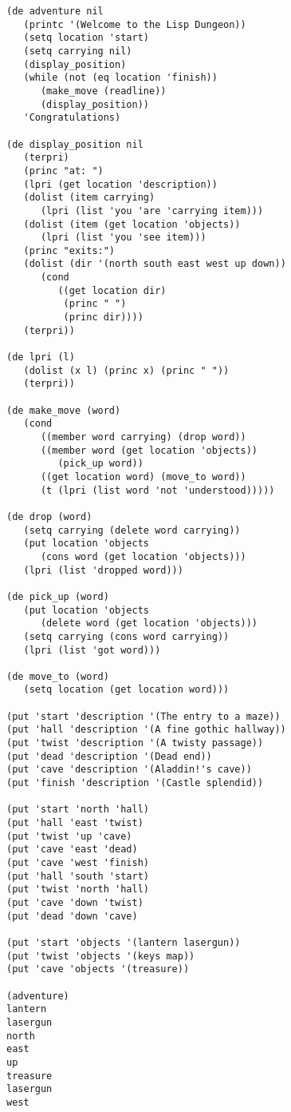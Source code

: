 {\small\begin{verbatim}
(de adventure nil
   (printc '(Welcome to the Lisp Dungeon))
   (setq location 'start)
   (setq carrying nil)
   (display_position)
   (while (not (eq location 'finish))
      (make_move (readline))
      (display_position))
   'Congratulations)

(de display_position nil
   (terpri)
   (princ "at: ")
   (lpri (get location 'description))
   (dolist (item carrying)
      (lpri (list 'you 'are 'carrying item)))
   (dolist (item (get location 'objects))
      (lpri (list 'you 'see item)))
   (princ "exits:")
   (dolist (dir '(north south east west up down))
      (cond
         ((get location dir)
          (princ " ")
          (princ dir))))
   (terpri))

(de lpri (l)
   (dolist (x l) (princ x) (princ " "))
   (terpri))

(de make_move (word)
   (cond
      ((member word carrying) (drop word))
      ((member word (get location 'objects))
         (pick_up word))
      ((get location word) (move_to word))
      (t (lpri (list word 'not 'understood)))))

(de drop (word)
   (setq carrying (delete word carrying))
   (put location 'objects
      (cons word (get location 'objects)))
   (lpri (list 'dropped word)))

(de pick_up (word)
   (put location 'objects
      (delete word (get location 'objects)))
   (setq carrying (cons word carrying))
   (lpri (list 'got word)))

(de move_to (word)
   (setq location (get location word)))

(put 'start 'description '(The entry to a maze))
(put 'hall 'description '(A fine gothic hallway))
(put 'twist 'description '(A twisty passage))
(put 'dead 'description '(Dead end))
(put 'cave 'description '(Aladdin!'s cave))
(put 'finish 'description '(Castle splendid))

(put 'start 'north 'hall)
(put 'hall 'east 'twist)
(put 'twist 'up 'cave)
(put 'cave 'east 'dead)
(put 'cave 'west 'finish)
(put 'hall 'south 'start)
(put 'twist 'north 'hall)
(put 'cave 'down 'twist)
(put 'dead 'down 'cave)

(put 'start 'objects '(lantern lasergun))
(put 'twist 'objects '(keys map))
(put 'cave 'objects '(treasure))

(adventure)
lantern
lasergun
north
east
up
treasure
lasergun
west

\end{verbatim}}

